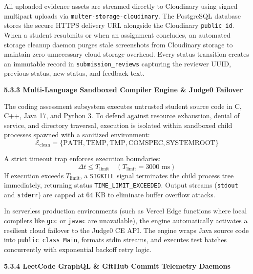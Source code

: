 {All uploaded evidence assets are streamed directly to Cloudinary using signed multipart uploads via \texttt{multer-storage-cloudinary}. The PostgreSQL database stores the secure HTTPS delivery URL alongside the Cloudinary \texttt{public\_id}. When a student resubmits or when an assignment concludes, an automated storage cleanup daemon purges stale screenshots from Cloudinary storage to maintain zero unnecessary cloud storage overhead. Every status transition creates an immutable record in \texttt{submission\_reviews} capturing the reviewer UUID, previous status, new status, and feedback text.

\vspace{0.4cm}
{\fontsize{13pt}{17pt}\selectfont\bfseries 5.3.3 Multi-Language Sandboxed Compiler Engine \& Judge0 Failover\par}
\vspace{0.2cm}

The coding assessment subsystem executes untrusted student source code in C, C++, Java 17, and Python 3. To defend against resource exhaustion, denial of service, and directory traversal, execution is isolated within sandboxed child processes spawned with a sanitized environment:
\begin{equation}
\mathcal{E}_{\text{clean}} = \{\text{PATH}, \text{TEMP}, \text{TMP}, \text{COMSPEC}, \text{SYSTEMROOT}\} \tag{4}
\end{equation}

A strict timeout trap enforces execution boundaries:
\begin{equation}
\Delta t \le T_{\text{limit}} \quad (T_{\text{limit}} = 3000\text{ ms}) \tag{5}
\end{equation}
If execution exceeds $T_{\text{limit}}$, a \texttt{SIGKILL} signal terminates the child process tree immediately, returning status \texttt{TIME\_LIMIT\_EXCEEDED}. Output streams (\texttt{stdout} and \texttt{stderr}) are capped at 64 KB to eliminate buffer overflow attacks.

In serverless production environments (such as Vercel Edge functions where local compilers like \texttt{gcc} or \texttt{javac} are unavailable), the engine automatically activates a resilient cloud failover to the Judge0 CE API. The engine wraps Java source code into \texttt{public class Main}, formats stdin streams, and executes test batches concurrently with exponential backoff retry logic.

\vspace{0.4cm}
{\fontsize{13pt}{17pt}\selectfont\bfseries 5.3.4 LeetCode GraphQL \& GitHub Commit Telemetry Daemons\par}
\vspace{0.2cm}

}
